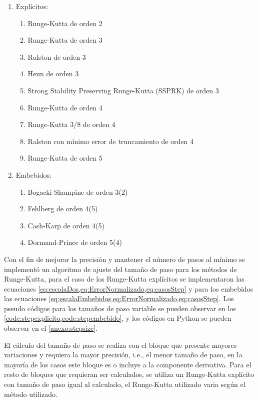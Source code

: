         \begin{enumerate}[leftmargin=\parindent]
            \item Explícitos:
                \begin{enumerate}
                    \item Runge-Kutta de orden 2
                    \item Runge-Kutta de orden 3
                    \item Ralston de orden 3
                    \item Heun de orden 3
                    \item Strong Stability Preserving Runge-Kutta (SSPRK) de orden 3
                    \item Runge-Kutta de orden 4
                    \item Runge-Kutta 3/8 de orden 4
                    \item Ralston con mínimo error de truncamiento de orden 4
                    \item Runge-Kutta de orden 5
                \end{enumerate}
            \item Embebidos:
                \begin{enumerate}
                    \item Bogacki-Shampine de orden 3(2)
                    \item Fehlberg de orden 4(5)
                    \item Cash-Karp de orden 4(5)
                    \item Dormand-Prince de orden 5(4)
                \end{enumerate}
        \end{enumerate}

        Con el fin de mejorar la precisión y mantener el número de pasos al mínimo se implementó un algoritmo de ajuste del tamaño de paso para los métodos de Runge-Kutta, para el caso de los Runge-Kutta explícitos se implementaron las ecuaciones \cref{eq:escalaDos,eq:ErrorNormalizado,eq:casosStep} y para los embebidos las ecuaciones \cref{eq:escalaEmbebidos,eq:ErrorNormalizado,eq:casosStep}. Los pseudo códigos para los tamaños de paso variable se pueden observar en los \cref{code:stepexplicito,code:stepembebido}, y los códigos en Python se pueden observar en el \ref{anexo:stepsize}.

        El cálculo del tamaño de paso se realiza con el bloque que presente mayores variaciones y requiera la mayor precisión, i.e., el menor tamaño de paso, en la mayoría de los casos este bloque es o incluye a la componente derivativa. Para el resto de bloques que requieran ser calculados, se utiliza un Runge-Kutta explícito con tamaño de paso igual al calculado, el Runge-Kutta utilizado varia según el método utilizado.

